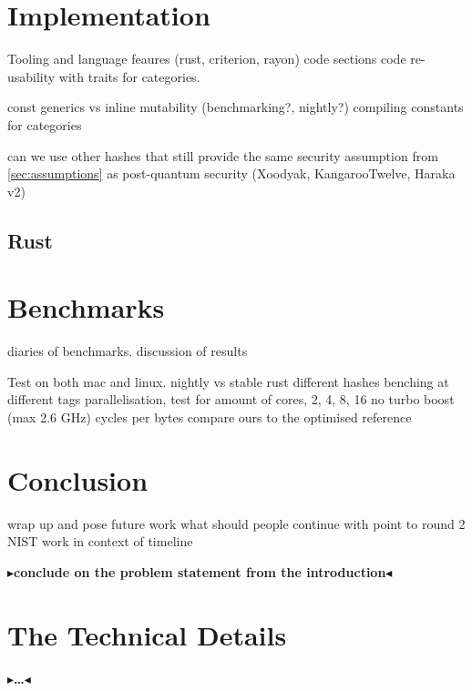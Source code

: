 \documentclass[twoside,11pt,openright]{report}
\theoremstyle{definition}
\theoremstyle{plain}
\newcommand{\todo}[1]{{\color[rgb]{.5,0,0}\textbf{$\blacktriangleright$#1$\blacktriangleleft$}}}
\begin{document}

\chapter{Implementation}
\label{ch:impl}

Tooling and language feaures (rust, criterion, rayon)
code sections
code re-usability with traits for categories.

const generics vs inline mutability (benchmarking?, nightly?)
compiling constants for categories

can we use other hashes that still provide the same security assumption from \autoref{sec:assumptions} as post-quantum security (Xoodyak, KangarooTwelve, Haraka v2)

\section{Rust}
\cite{nistsaferlanguages}


\chapter{Benchmarks}
\label{ch:bench}
diaries of benchmarks.
discussion of results

Test on both mac and linux.
nightly vs stable rust
different hashes
benching at different tags
parallelisation, test for amount of cores, 2, 4, 8, 16
no turbo boost (max 2.6 GHz)
cycles per bytes
compare ours to the optimised reference


\chapter{Conclusion}
\label{ch:conclusion}

wrap up and pose future work
what should people continue with
point to round 2 NIST
work in context of timeline

\todo{conclude on the problem statement from the introduction}


\cleardoublepage
{}




\cleardoublepage
\appendix
\chapter{The Technical Details}

\todo{\dots}
\end{document}
